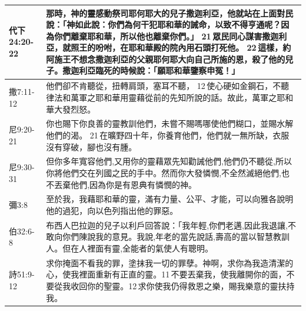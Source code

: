 \begin{table}[H]
\begin{tabular}{p{5em}p{43em}}
代下24:20-22&那時，神的靈感動祭司耶何耶大的兒子撒迦利亞，他就站在上面對民說：「神如此說：你們為何干犯耶和華的誡命，以致不得亨通呢？因為你們離棄耶和華，所以他也離棄你們。」 21 眾民同心謀害撒迦利亞，就照王的吩咐，在耶和華殿的院內用石頭打死他。 22 這樣，約阿施王不想念撒迦利亞的父親耶何耶大向自己所施的恩，殺了他的兒子。撒迦利亞臨死的時候說：「願耶和華鑒察申冤！」\\  \midrule

撒7:11-12&他們卻不肯聽從，扭轉肩頭，塞耳不聽， 12 使心硬如金鋼石，不聽律法和萬軍之耶和華用靈藉從前的先知所說的話。故此，萬軍之耶和華大發烈怒。\\  \midrule

尼9:20-21&你也賜下你良善的靈教訓他們，未嘗不賜嗎哪使他們糊口，並賜水解他們的渴。 21 在曠野四十年，你養育他們，他們就一無所缺，衣服沒有穿破，腳也沒有腫。\\  \midrule
尼9:30-31&但你多年寬容他們,又用你的靈藉眾先知勸誡他們,他們仍不聽從,所以你將他們交在列國之民的手中。然而你大發憐憫,不全然滅絕他們,也不丟棄他們,因為你是有恩典有憐憫的神。\\  \midrule

彌3:8&至於我，我藉耶和華的靈，滿有力量、公平、才能，可以向雅各說明他的過犯，向以色列指出他的罪惡。\\  \midrule
伯32:6-8&布西人巴拉迦的兒子以利戶回答說：「我年輕,你們老邁,因此我退讓,不敢向你們陳說我的意見。我說,年老的當先說話,壽高的當以智慧教訓人。但在人裡面有靈,全能者的氣使人有聰明。\\  \midrule

詩51:9-12&求你掩面不看我的罪，塗抹我一切的罪孽。神啊，求你為我造清潔的心，使我裡面重新有正直的靈。11 不要丟棄我，使我離開你的面，不要從我收回你的聖靈。12 求你使我仍得救恩之樂，賜我樂意的靈扶持我。
\\\bottomrule
\end{tabular}
\end{table}




